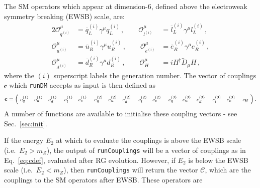 \documentclass[notitlepage,12pt]{article}
\newcommand{\runDM}{\texttt{runDM}\xspace}
\newcommand\scalemath[2]{\scalebox{#1}{\mbox{\ensuremath{\displaystyle #2}}}}
\begin{document}
The SM operators which appear at dimension-6, defined above the electroweak symmetry breaking (EWSB) scale, are:
\begin{alignat}{2}
\mathcal{O}_{q^{(i)}}^\mu &= \overline{q}^{(i)}_L \gamma^\mu q^{(i)}_L \,, \qquad \mathcal{O}_{l^{(i)}}^\mu   &= \overline{l}^{(i)}_L \gamma^\mu l^{(i)}_L\,, \nonumber \\
\mathcal{O}_{u^{(i)}}^\mu &= \overline{u}^{(i)}_R \gamma^\mu u^{(i)}_R\,, \qquad \mathcal{O}_{e^{(i)}}^\mu &= \overline{e}^{(i)}_R \gamma^\mu e^{(i)}_R \,, \\
\mathcal{O}_{d^{(i)}}^\mu &= \overline{d}^{(i)}_R \gamma^\mu d^{(i)}_R\,, \qquad\mathcal{O}_H^\mu &= i H^\dagger \overleftrightarrow{D}_\mu H\,, \nonumber
\end{alignat}
where the $(i)$ superscript labels the generation number. The vector of couplings $\mathcal{c}$ which \runDM accepts as input is then defined as 
\begin{equation}
\scalemath{0.9}{\mathbf{c} = \left(\!\begin{array}{cccccccccccccccc}
c_{ q}^{(1)} & c_{u}^{(1)} & c_{ d}^{(1)}\,&\, c_{ l}^{(1)} & c_{ e}^{(1)} \,&\, 
c_{ q}^{(2)} & c_{ u}^{(2)} & c_{ d}^{(2)} \,&\, c_{ l}^{(2)} & c_{ e}^{(2)} \,&\,
c_{ q}^{(3)} & c_{ u}^{(3)} & c_{ d}^{(3)} \,&\, c_{ l}^{(3)} & c_{ e}^{(3)} \,&\,
c_{ \!H} \end{array}\!\right)}\,.
\label{eq:cdef}
\end{equation}
A number of functions are available to initialise these coupling vectors - see Sec.~\ref{sec:init}.

If the energy $E_2$ at which to evaluate the couplings is above the EWSB scale (i.e.~$E_2 > m_Z$), the output of \texttt{runCouplings} will be a vector of couplings as in Eq.~\ref{eq:cdef}, evaluated after RG evolution. However, if $E_2$ is below the EWSB scale (i.e.~$E_2 <m_Z$), then \texttt{runCouplings} will return the vector $\mathcal{C}$, which are the couplings to the SM operators after EWSB. These operators are
\end{document}
